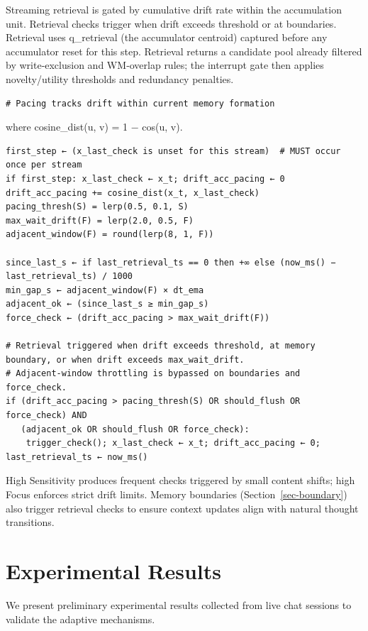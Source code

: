 \documentclass[
  letterpaper,
  DIV=11,
  numbers=noendperiod]{scrartcl}
\begin{document}
Streaming retrieval is gated by cumulative drift rate within the
accumulation unit. Retrieval checks trigger when drift exceeds threshold
or at boundaries. Retrieval uses q\_retrieval (the accumulator centroid)
captured before any accumulator reset for this step. Retrieval returns a
candidate pool already filtered by write‑exclusion and WM‑overlap rules;
the interrupt gate then applies novelty/utility thresholds and
redundancy penalties.

\begin{verbatim}
# Pacing tracks drift within current memory formation
\end{verbatim}

where cosine\_dist(u, v) = 1 − cos(u, v).

\begin{verbatim}
first_step ← (x_last_check is unset for this stream)  # MUST occur once per stream
if first_step: x_last_check ← x_t; drift_acc_pacing ← 0
drift_acc_pacing += cosine_dist(x_t, x_last_check)
pacing_thresh(S) = lerp(0.5, 0.1, S)
max_wait_drift(F) = lerp(2.0, 0.5, F)
adjacent_window(F) = round(lerp(8, 1, F))

since_last_s ← if last_retrieval_ts == 0 then +∞ else (now_ms() − last_retrieval_ts) / 1000
min_gap_s ← adjacent_window(F) × dt_ema
adjacent_ok ← (since_last_s ≥ min_gap_s)
force_check ← (drift_acc_pacing > max_wait_drift(F))

# Retrieval triggered when drift exceeds threshold, at memory boundary, or when drift exceeds max_wait_drift.
# Adjacent-window throttling is bypassed on boundaries and force_check.
if (drift_acc_pacing > pacing_thresh(S) OR should_flush OR force_check) AND
   (adjacent_ok OR should_flush OR force_check):
    trigger_check(); x_last_check ← x_t; drift_acc_pacing ← 0; last_retrieval_ts ← now_ms()
\end{verbatim}

High Sensitivity produces frequent checks triggered by small content
shifts; high Focus enforces strict drift limits. Memory boundaries
(Section~\ref{sec-boundary}) also trigger retrieval checks to ensure
context updates align with natural thought transitions.

\section{Experimental Results}\label{sec-experimental}

We present preliminary experimental results collected from live chat
sessions to validate the adaptive mechanisms.
\end{document}

